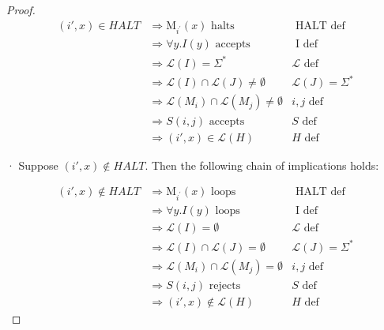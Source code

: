 \documentclass[10pt]{article}
\begin{document}
\begin{enumerate}[label={}]
\begin{proof}
                  $$
                        \begin{array}{rlr}
                              (i', x) \in H A L T & \Longrightarrow \text{M}_{i^{\prime}}(x) \text { halts }              & \text { HALT def }        \\
                                                  & \Longrightarrow \forall y. I(y) \text { accepts }                     & \text { I def }           \\
                                                  & \Longrightarrow \mathcal{L}(I)=\Sigma^*                               & \mathcal{L} \text { def } \\
                                                  & \Longrightarrow \mathcal{L}(I) \cap \mathcal{L}(J) \neq \emptyset     & \mathcal{L}(J)=\Sigma^*   \\
                                                  & \Longrightarrow \mathcal{L}(M_i) \cap \mathcal{L}(M_j) \neq \emptyset & i, j \text { def }        \\
                                                  & \Longrightarrow S(i, j) \text { accepts }                             & S \text { def }           \\
                                                  & \Longrightarrow(i', x) \in \mathcal{L}(H)                             & H \text { def }
                        \end{array}
                  $$

                  · Suppose $(i', x) \notin H A L T$. Then the following chain of implications holds:

                  $$
                        \begin{array}{rlr}
                              (i', x) \notin H A L T & \Longrightarrow \text{M}_{i^{\prime}}(x) \text { loops }           & \text { HALT def }        \\
                                                     & \Longrightarrow \forall y. I(y) \text { loops }                    & \text { I def }           \\
                                                     & \Longrightarrow \mathcal{L}(I)=\emptyset                           & \mathcal{L} \text { def } \\
                                                     & \Longrightarrow \mathcal{L}(I) \cap \mathcal{L}(J) = \emptyset     & \mathcal{L}(J)=\Sigma^*   \\
                                                     & \Longrightarrow \mathcal{L}(M_i) \cap \mathcal{L}(M_j) = \emptyset & i, j \text { def }        \\
                                                     & \Longrightarrow S(i, j) \text { rejects }                          & S \text { def }           \\
                                                     & \Longrightarrow(i', x) \notin \mathcal{L}(H)                       & H \text { def }
                        \end{array}
                  $$


\end{proof}
\end{enumerate}
\end{document}

